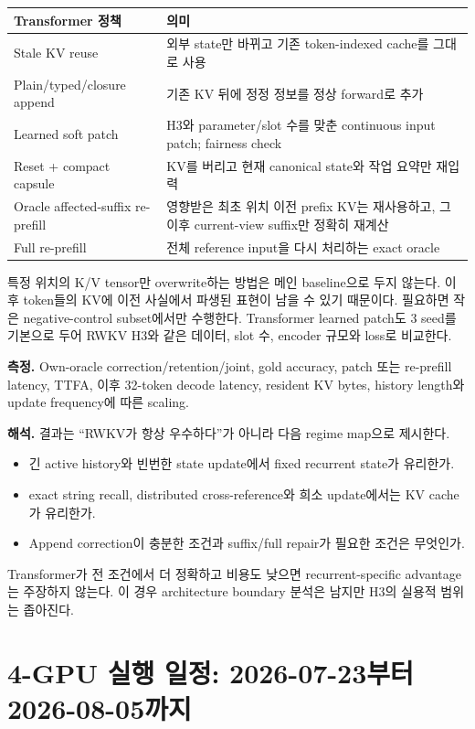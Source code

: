 \documentclass[10.5pt,a4paper]{article}
\begin{document}
\begin{table}[H]
\centering
\begin{tabularx}{\textwidth}{@{}L{42mm}Y@{}}
\toprule
Transformer 정책 & 의미 \\
\midrule
Stale KV reuse & 외부 state만 바뀌고 기존 token-indexed cache를 그대로 사용 \\
Plain/typed/closure append & 기존 KV 뒤에 정정 정보를 정상 forward로 추가 \\
Learned soft patch & H3와 parameter/slot 수를 맞춘 continuous input patch; fairness check \\
Reset + compact capsule & KV를 버리고 현재 canonical state와 작업 요약만 재입력 \\
Oracle affected-suffix re-prefill & 영향받은 최초 위치 이전 prefix KV는 재사용하고, 그 이후 current-view suffix만 정확히 재계산 \\
Full re-prefill & 전체 reference input을 다시 처리하는 exact oracle \\
\bottomrule
\end{tabularx}
\end{table}

특정 위치의 K/V tensor만 overwrite하는 방법은 메인 baseline으로 두지 않는다. 이후 token들의 KV에 이전 사실에서 파생된 표현이 남을 수 있기 때문이다. 필요하면 작은 negative-control subset에서만 수행한다. Transformer learned patch도 3 seed를 기본으로 두어 RWKV H3와 같은 데이터, slot 수, encoder 규모와 loss로 비교한다.

\textbf{측정.} Own-oracle correction/retention/joint, gold accuracy, patch 또는 re-prefill latency, TTFA, 이후 32-token decode latency, resident KV bytes, history length와 update frequency에 따른 scaling.

\textbf{해석.} 결과는 ``RWKV가 항상 우수하다''가 아니라 다음 regime map으로 제시한다.
\begin{itemize}
\item 긴 active history와 빈번한 state update에서 fixed recurrent state가 유리한가.
\item exact string recall, distributed cross-reference와 희소 update에서는 KV cache가 유리한가.
\item Append correction이 충분한 조건과 suffix/full repair가 필요한 조건은 무엇인가.
\end{itemize}
Transformer가 전 조건에서 더 정확하고 비용도 낮으면 recurrent-specific advantage는 주장하지 않는다. 이 경우 architecture boundary 분석은 남지만 H3의 실용적 범위는 좁아진다.

\section{4-GPU 실행 일정: 2026-07-23부터 2026-08-05까지}
\end{document}
